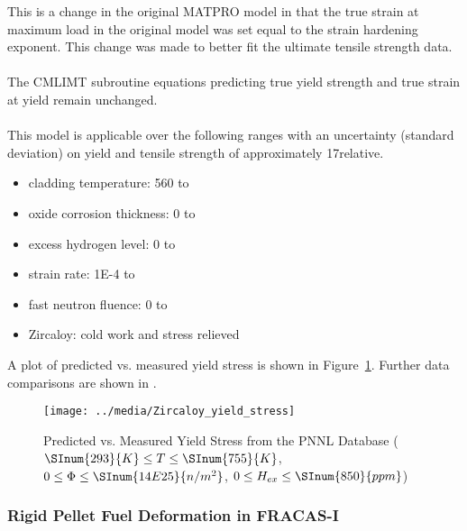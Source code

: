 This is a change in the original MATPRO model in that the true strain at maximum load in the
original model was set equal to the strain hardening exponent. This change was made to better fit
the ultimate tensile strength data.
\\
\\
The CMLIMT subroutine equations predicting true yield strength and true strain at yield remain
unchanged.
\\
\\
This model is applicable over the following ranges with an uncertainty (standard deviation) on yield
and tensile strength of approximately 17\percent relative. 

\begin{itemize}
    \item   cladding temperature: 560 to          
    \item    oxide corrosion thickness: 0 to          
    \item    excess hydrogen level: 0 to          
    \item    strain rate: \num{1E-4} to          
    \item    fast neutron fluence: 0 to          
    \item    Zircaloy: cold work and stress relieved         
\end{itemize}

A plot of predicted vs. measured yield stress is shown in
Figure~\ref{fig:predicted_vs_measured_yield_stress_PNNL_database}.  Further data comparisons are
shown in \cite{ref:Geelhood2008a}.

\begin{figure}
    \texttt{[image: ../media/Zircaloy\_yield\_stress]} 
    \caption{Predicted vs. Measured Yield Stress from the PNNL Database ($\SInum{293}{K} \leq T \leq \SInum{755}{K}$, $0 \leq \Phi \leq  \SInum{14E25}{n/m^2}$, $0 \leq H_{ex} \leq \SInum{850}{ppm}$)}
    \label{fig:predicted_vs_measured_yield_stress_PNNL_database}
\end{figure}

\subsubsection{Rigid Pellet Fuel Deformation in FRACAS-I}\label{section:rigid-pellet-fuel-deformation-in-fracas-i}

